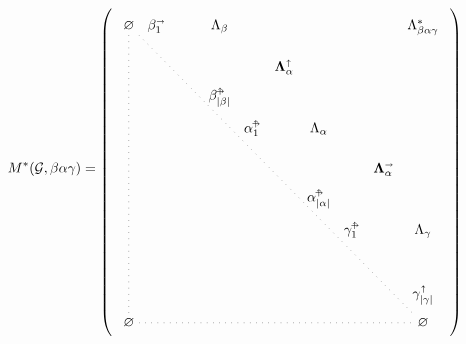 \documentclass[sigplan,review,anonymous,acmsmall]{acmart}\settopmatter{printfolios=false,printccs=false,printacmref=false}
\begin{document}
\begin{equation*}
  M^*(\mathcal{G}, \beta\alpha\gamma)=
\begin{tikzpicture}[
  scale=0.4,
  baseline,
  label distance=10pt %
]

\matrix [matrix of math nodes,left delimiter=(,right delimiter=),row sep=0.1cm,column sep=0.1cm] (m) {
\varnothing & \beta_1^\shri & \phantom{\cdots} & \,\Lambda_{\beta}\,  &        &                      & \phantom{\qs{|\alpha|}} &        &                      & \smash{\Lambda_{\beta\alpha\gamma}^*}      \\
            &               & \phantom{\ddots} & \phantom{\vdots} &        & \bm\Lambda_\alpha^\shup &                  &        &                      &        \\
            &               &                  & \bs{|\beta|}     &        &                      &                  &        &                      & \phantom{\bs{|\beta|}}       \\
            &               &                  &                  & \qs{1} & \phantom{\cdots}     & \Lambda_{\alpha} &        &                      & \phantom{\vs{j}} \\
            &               &                  &                  &        & \phantom{\ddots}     & \phantom{\vdots} &        & \bm\Lambda_\alpha^\shri &        \\
            &               &                  &                  &        &                      & \qs{|\alpha|}           &        &                      & \phantom{\qs{|\alpha|}}      \\
            &               &                  &                  &        &                      &                  & \gs{1} & \phantom{\cdots}     & \Lambda_{\gamma}\vphantom{\gs{1}} \\
            &               &                  &                  &        &                      &                  &        & \phantom{\ddots}     & \phantom{\vdots} \\
            &               &                  &                  &        &                      &                  &        &                      & \gamma_{|\gamma|}^\shup      \\
\varnothing &               &                  &                  &        &                      &                  &        &                      & \varnothing\\
};

\draw[loosely dotted] (m-1-1.south) -- (m-10-1.north);
\draw[loosely dotted] (m-1-1.south east) -- (m-10-10.north west);
\draw[loosely dotted] (m-10-1.east) -- (m-10-10.west);


\end{tikzpicture}
\end{equation*}
\end{document}
